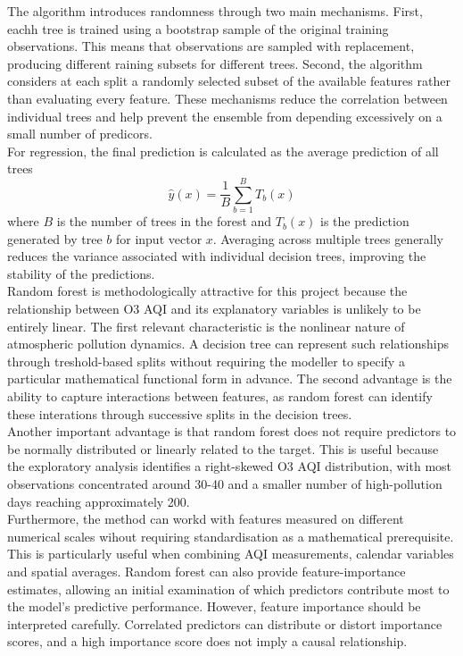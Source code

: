 \documentclass[11pt,a4paper]{article}
\begin{document}
\noindent
The algorithm introduces randomness through two main mechanisms. First, eachh tree is trained using a bootstrap sample of the original training observations. This means that observations are sampled with replacement, producing different raining subsets for different trees. Second, the algorithm considers at each split a randomly selected subset of the available features rather than evaluating every feature. These mechanisms reduce the correlation between individual trees and help prevent the ensemble from depending excessively on a small number of predicors.\\

\noindent
For regression, the final prediction is calculated as the average prediction of all trees
\begin{equation}
    \hat{y}(x)=\frac{1}{B}\sum_{b=1}^BT_b(x)
\end{equation}
where $B$ is the number of trees in the forest and $T_b(x)$ is the prediction generated by tree $b$ for input vector $x$. Averaging across multiple trees generally reduces the variance associated with individual decision trees, improving the stability of the predictions.\\

\noindent
Random forest is methodologically attractive for this project because the relationship between O3 AQI and its explanatory variables is unlikely to be entirely linear. The first relevant characteristic is the nonlinear nature of atmospheric pollution dynamics. A decision tree can represent such relationships through treshold-based splits without requiring the modeller to specify a particular mathematical functional form in advance. The second advantage is the ability to capture interactions between features, as random forest can identify these interations through successive splits in the decision trees.\\

\noindent
Another important advantage is that random forest does not require predictors to be normally distributed or linearly related to the target. This is useful because the exploratory analysis identifies a right-skewed O3 AQI distribution, with most observations concentrated around 30-40 and a smaller number of high-pollution days reaching approximately 200.\\

\noindent
Furthermore, the method can workd with features measured on different numerical scales wihout requiring standardisation as a mathematical prerequisite. This is particularly useful when combining AQI measurements, calendar variables and spatial averages. Random forest can also provide feature-importance estimates, allowing an initial examination of which predictors contribute most to the model's predictive performance. However, feature importance should be interpreted carefully. Correlated predictors can distribute or distort importance scores, and a high importance score does not imply a causal relationship.\\
\end{document}
